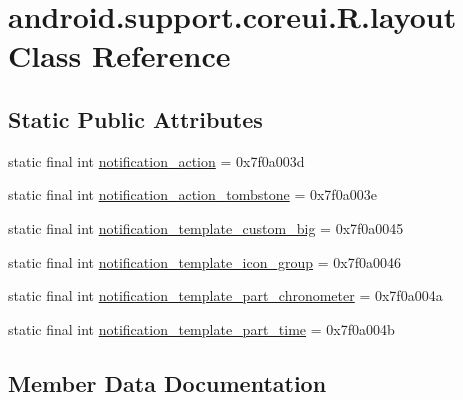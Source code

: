 \hypertarget{classandroid_1_1support_1_1coreui_1_1R_1_1layout}{}\section{android.\+support.\+coreui.\+R.\+layout Class Reference}
\label{classandroid_1_1support_1_1coreui_1_1R_1_1layout}
\subsection*{Static Public Attributes}
\begin{DoxyCompactItemize}
\item 
static final int \mbox{\hyperlink{classandroid_1_1support_1_1coreui_1_1R_1_1layout_a1dda41cfcdb2fd191b6eec11290949a6}{notification\+\_\+action}} = 0x7f0a003d
\item 
static final int \mbox{\hyperlink{classandroid_1_1support_1_1coreui_1_1R_1_1layout_af6e1c6ee8d56914a4fb8eeb45a34974d}{notification\+\_\+action\+\_\+tombstone}} = 0x7f0a003e
\item 
static final int \mbox{\hyperlink{classandroid_1_1support_1_1coreui_1_1R_1_1layout_a77a5624486e61ded730f4089ff13ff0f}{notification\+\_\+template\+\_\+custom\+\_\+big}} = 0x7f0a0045
\item 
static final int \mbox{\hyperlink{classandroid_1_1support_1_1coreui_1_1R_1_1layout_aae7fb0b25261997aa462aa8c530778c9}{notification\+\_\+template\+\_\+icon\+\_\+group}} = 0x7f0a0046
\item 
static final int \mbox{\hyperlink{classandroid_1_1support_1_1coreui_1_1R_1_1layout_a97537d127c2746ea629497a3ad4cab14}{notification\+\_\+template\+\_\+part\+\_\+chronometer}} = 0x7f0a004a
\item 
static final int \mbox{\hyperlink{classandroid_1_1support_1_1coreui_1_1R_1_1layout_a102d25ab2960dcd40dcace441e1fe808}{notification\+\_\+template\+\_\+part\+\_\+time}} = 0x7f0a004b
\end{DoxyCompactItemize}


\subsection{Member Data Documentation}
\mbox{\label{classandroid_1_1support_1_1coreui_1_1R_1_1layout_a1dda41cfcdb2fd191b6eec11290949a6}} 

